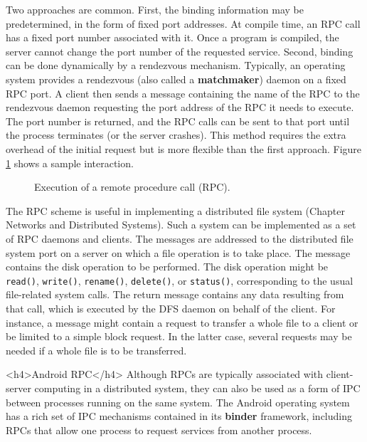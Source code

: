 Two approaches are common. First, the binding information may be predetermined, in the form of fixed port addresses. At compile time, an RPC call has a fixed port number associated with it. Once a program is compiled, the server cannot change the port number of the requested service. Second, binding can be done dynamically by a rendezvous mechanism. Typically, an operating system provides a rendezvous (also called a \textbf{matchmaker}) daemon on a fixed RPC port. A client then sends a message containing the name of the RPC to the rendezvous daemon requesting the port address of the RPC it needs to execute. The port number is returned, and the RPC calls can be sent to that port until the process terminates (or the server crashes). This method requires the extra overhead of the initial request but is more flexible than the first approach. Figure \ref{fig:rpc-execution} shows a sample interaction.

\begin{figure}[h!]
\centering
\caption{Execution of a remote procedure call (RPC).}\label{fig:rpc-execution}
\end{figure}

The RPC scheme is useful in implementing a distributed file system (Chapter Networks and Distributed Systems). Such a system can be implemented as a set of RPC daemons and clients. The messages are addressed to the distributed file system port on a server on which a file operation is to take place. The message contains the disk operation to be performed. The disk operation might be \texttt{read()}, \texttt{write()}, \texttt{rename()}, \texttt{delete()}, or \texttt{status()}, corresponding to the usual file-related system calls. The return message contains any data resulting from that call, which is executed by the DFS daemon on behalf of the client. For instance, a message might contain a request to transfer a whole file to a client or be limited to a simple block request. In the latter case, several requests may be needed if a whole file is to be transferred.

<h4>Android RPC</h4>
Although RPCs are typically associated with client-server computing in a distributed system, they can also be used as a form of IPC between processes running on the same system. The Android operating system has a rich set of IPC mechanisms contained in its \textbf{binder} framework, including RPCs that allow one process to request services from another process.


